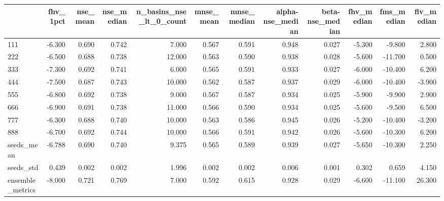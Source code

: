\begin{tabular}{lrrrrrrrrrrr}
\toprule
 & fhv_1pct & nse_mean & nse_median & n_basins_nse_lt_0_count & mnse_mean & mnse_median & alpha-nse_median & beta-nse_median & fhv_median & fms_median & flv_median \\
\midrule
111 & -6.300 & 0.690 & 0.742 & 7.000 & 0.567 & 0.591 & 0.948 & 0.027 & -5.300 & -9.800 & 2.800 \\
222 & -6.500 & 0.688 & 0.738 & 12.000 & 0.563 & 0.590 & 0.938 & 0.028 & -5.600 & -11.700 & 0.500 \\
333 & -7.300 & 0.692 & 0.741 & 6.000 & 0.565 & 0.591 & 0.933 & 0.027 & -6.000 & -10.400 & 6.200 \\
444 & -7.500 & 0.687 & 0.743 & 10.000 & 0.562 & 0.587 & 0.937 & 0.029 & -6.000 & -10.400 & -3.900 \\
555 & -6.800 & 0.692 & 0.738 & 9.000 & 0.567 & 0.587 & 0.934 & 0.025 & -5.900 & -9.900 & 2.900 \\
666 & -6.900 & 0.691 & 0.738 & 11.000 & 0.566 & 0.590 & 0.934 & 0.025 & -5.600 & -9.500 & 6.500 \\
777 & -6.300 & 0.688 & 0.740 & 10.000 & 0.563 & 0.586 & 0.945 & 0.026 & -5.200 & -10.400 & -3.200 \\
888 & -6.700 & 0.692 & 0.744 & 10.000 & 0.566 & 0.591 & 0.942 & 0.026 & -5.600 & -10.300 & 6.200 \\
seeds_mean & -6.788 & 0.690 & 0.740 & 9.375 & 0.565 & 0.589 & 0.939 & 0.027 & -5.650 & -10.300 & 2.250 \\
seeds_std & 0.439 & 0.002 & 0.002 & 1.996 & 0.002 & 0.002 & 0.006 & 0.001 & 0.302 & 0.659 & 4.150 \\
ensemble_metrics & -8.000 & 0.721 & 0.769 & 7.000 & 0.592 & 0.615 & 0.928 & 0.029 & -6.600 & -11.100 & 26.300 \\
\bottomrule
\end{tabular}

